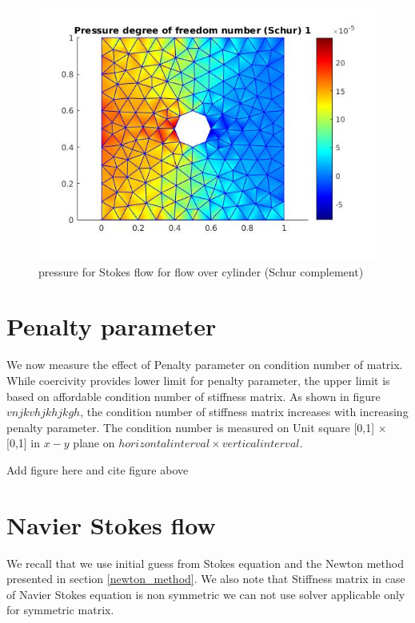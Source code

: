 \documentclass[a4paper,12pt]{book}
\begin{document}
\begin{figure}
  \includegraphics[width=\linewidth]{pressure_Schur.jpg}
  \caption{pressure for Stokes flow for flow over cylinder (Schur complement)}
  \label{fig:pressure_cylinder_stokes_schur}
\end{figure}

\section{Penalty parameter}

We now measure the effect of Penalty parameter on condition number of matrix. While coercivity provides lower limit for penalty parameter, the upper limit is based on affordable condition number of stiffness matrix. As shown in figure $vnjkvhjkhjkgh$, the condition number of stiffness matrix increases with increasing penalty parameter.
The condition number is measured on Unit square [0,1] $\times$ [0,1] in $x-y$ plane on $horizontal interval \times vertical interval$.

\begin{Huge}
Add figure here and cite figure above
\end{Huge}

\section{Navier Stokes flow}

We recall that we use initial guess from Stokes equation and the Newton method presented in section  \ref{newton_method}. We also note that Stiffness matrix in case of Navier Stokes equation is non symmetric we can not use solver applicable only for symmetric matrix. 









\end{document}
